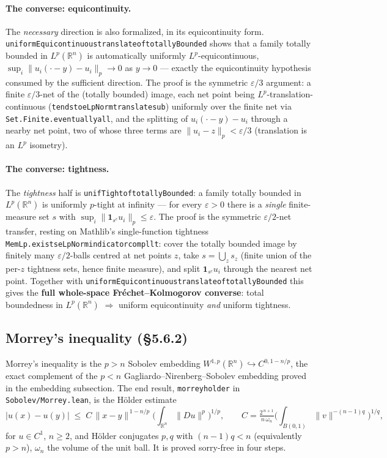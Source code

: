 ﻿\documentclass[12pt, a4paper]{article}
\renewcommand{\_}{\origunderscore\allowbreak}
\theoremstyle{definition}
\theoremstyle{plain}
\begin{document}
\paragraph{The converse: equicontinuity.}  The \emph{necessary} direction is also formalized, in its
equicontinuity form.  \texttt{uniformEquicontinuous\_translate\_of\_totallyBounded} shows that a family totally bounded in
$L^p(\mathbb{R}^n)$ is automatically uniformly $L^p$-equicontinuous,
$\sup_i\|u_i(\cdot-y)-u_i\|_p\to0$ as $y\to0$ --- exactly the equicontinuity hypothesis consumed by
the sufficient direction.  The proof is the symmetric $\varepsilon/3$ argument: a finite
$\varepsilon/3$-net of the (totally bounded) image, each net point being $L^p$-translation-continuous
(\texttt{tendsto\_eLpNorm\_translate\_sub}) uniformly over the finite net via
\texttt{Set.Finite.eventually\_all}, and the splitting of $u_i(\cdot-y)-u_i$ through a nearby net
point, two of whose three terms are $\|u_i-z\|_p<\varepsilon/3$ (translation is an $L^p$ isometry).

\paragraph{The converse: tightness.}  The \emph{tightness} half is \texttt{unifTight\_of\_totallyBounded}: a family
totally bounded in $L^p(\mathbb{R}^n)$ is uniformly $p$-tight at infinity --- for every
$\varepsilon>0$ there is a \emph{single} finite-measure set $s$ with
$\sup_i\|\mathbf 1_{s^c}u_i\|_p\le\varepsilon$.  The proof is the symmetric $\varepsilon/2$-net
transfer, resting on Mathlib's single-function tightness
\texttt{MemLp.\allowbreak exists\_eLpNorm\_indicator\_compl\_lt}: cover the totally bounded image by
finitely many $\varepsilon/2$-balls centred at net points $z$, take $s=\bigcup_z s_z$ (finite union of
the per-$z$ tightness sets, hence finite measure), and split $\mathbf 1_{s^c}u_i$ through the nearest
net point.  Together with \texttt{uniformEquicontinuous\_translate\_of\_totallyBounded} this gives the
\textbf{full whole-space Fréchet--Kolmogorov converse}: total boundedness in $L^p(\mathbb{R}^n)$
$\Rightarrow$ uniform equicontinuity \emph{and} uniform tightness.

\subsection{Morrey's inequality (§5.6.2)}

Morrey's inequality is the $p>n$ Sobolev embedding $W^{1,p}(\mathbb{R}^n)\hookrightarrow
C^{0,1-n/p}$, the exact complement of the $p<n$ Gagliardo--Nirenberg--Sobolev embedding proved in the
embedding subsection.  The end result, \texttt{morrey\_holder} in
\texttt{Sobolev/\allowbreak Morrey.\allowbreak lean}, is the Hölder estimate
\[
  |u(x)-u(y)|\;\le\;C\,\|x-y\|^{\,1-n/p}\Big(\int_{\mathbb{R}^n}\|Du\|^{p}\Big)^{1/p},
  \qquad C=\tfrac{2^{\,n+1}}{n\,\omega_n}\Big(\!\int_{B(0,1)}\!\|v\|^{-(n-1)q}\Big)^{1/q},
\]
for $u\in C^1$, $n\ge2$, and Hölder conjugates $p,q$ with $(n-1)q<n$ (equivalently $p>n$), $\omega_n$
the volume of the unit ball.  It is proved sorry-free in four steps.
\end{document}
